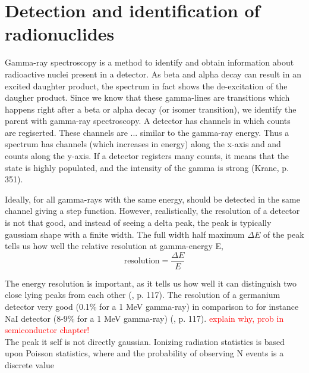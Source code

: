 \section{Detection and identification of radionuclides}
Gamma-ray spectroscopy is a method to identify and obtain information about radioactive nuclei present in a detector. As beta and alpha decay can result in an excited daughter product, the spectrum in fact shows the de-excitation of the daugher product. Since we know that these gamma-lines are transitions which happens right after a beta or alpha decay (or isomer transition), we identify the parent with gamma-ray spectroscopy. A detector has channels in which counts are regiserted. These channels are ... similar to the gamma-ray energy. Thus a spectrum has channels (which increases in energy) along the x-axis and and counts along the y-axis. If a detector registers many counts, it means that the state is highly populated, and the intensity of the gamma is strong (Krane, p. 351). 

Ideally, for all gamma-rays with the same energy, should be detected in the same channel giving a step function. However, realistically, the resolution of a detector is not that good, and instead of seeing a delta peak, the peak is typically gaussiam shape with a finite width. The full width half maximum $\Delta E$ of the peak tells us how well the relative resolution at gamma-energy E,
\begin{equation}
    \text{resolution} = \frac{\Delta E}{E}
\end{equation}

The energy resolution is important, as it tells us how well it can distinguish two close lying peaks from each other (\cite{Leo1994}, p. 117). The resolution of a germanium detector very good (0.1\% for a 1 MeV gamma-ray) in comparison to for instance NaI detector (8-9\% for a 1 MeV gamma-ray) (\cite{Leo1994}, p. 117). \textcolor{red}{explain why, prob in semiconductor chapter!} \\


The peak it self is not directly gaussian. Ionizing radiation statistics is based upon Poisson statistics, where  and the probability of observing N events is a discrete value

